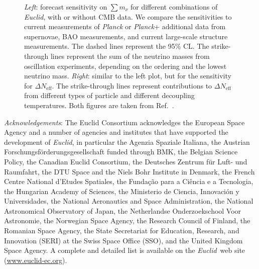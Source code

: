 \documentclass[a4paper,11pt]{article}
\newcommand{\euclid}{\textit{Euclid}\xspace}
\newcommand{\planck}{\textit{Planck}\xspace}
\newcommand{\dneff}{\Delta N_\mathrm{eff}}
\newcommand{\summnu}{\sum m_\nu}
\newcommand*{\AckInstitutions}{a number of agencies and
  institutes that have supported the development of \euclid, in
  particular
  the Agenzia Spaziale Italiana,
  the Austrian Forschungsf\"orderungsgesellschaft funded through BMK,
  the Belgian Science Policy,
  the Canadian Euclid Consortium,
  the Deutsches Zentrum f\"ur Luft- und Raumfahrt,
  the DTU Space and the Niels Bohr Institute in Denmark,
  the French Centre National d'Etudes Spatiales,
  the Funda\c{c}\~{a}o para a Ci\^{e}ncia e a Tecnologia,
  the Hungarian Academy of Sciences,
  the Ministerio de Ciencia, Innovaci\'{o}n y Universidades,
  the National Aeronautics and Space Administration,
  the National Astronomical Observatory of Japan,
  the Netherlandse Onderzoekschool Voor Astronomie,
  the Norwegian Space Agency,
  the Research Council of Finland,
  the Romanian Space Agency,
  the State Secretariat for Education, Research, and Innovation (SERI) at the Swiss
  Space Office (SSO),
  and the United Kingdom Space Agency.
  A complete and detailed list is available on the \euclid\ web site
  (\url{www.euclid-ec.org}).\xspace}
\newcommand{\AckEC}{The Euclid Consortium acknowledges the European
  Space Agency and \AckInstitutions}
\begin{document}
\begin{figure}[!htbp]
\begin{subfigure}{0.49\textwidth}
    \end{subfigure}
    \caption{\emph{Left}: forecast sensitivity on $\summnu$ for different combinations of \euclid, with or without CMB data. We compare the sensitivities to current measurements of \planck or \planck + additional data from supernovae, BAO measurements, and current large-scale structure measurements. The dashed lines represent the 95\% CL. The strike-through lines represent the sum of the neutrino masses from oscillation experiments, depending on the ordering and the lowest neutrino mass.
    \emph{Right}: similar to the left plot, but for the sensitivity for $\dneff$. The strike-through lines represent contributions to $\dneff$ from different types of particle and different decoupling temperatures.
    Both figures are taken from Ref.~\cite{EP-Archidiacono}.
    }
    \label{fig:results}
\end{figure}
\clearpage
\textit{Acknowledgements}: \AckEC



\end{document}
